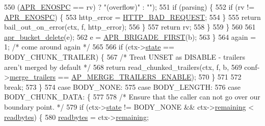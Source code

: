 \begin{DoxyCode}
{{{{{550                                       (\hyperlink{group__APR__Error_ga1dfc0bbf080f17b0b9010ef967542193}{APR\_ENOSPC} == rv) ? \textcolor{stringliteral}{"(overflow)"} : \textcolor{stringliteral}{""});
551                         \textcolor{keywordflow}{if} (parsing) \{
552                             \textcolor{keywordflow}{if} (rv != \hyperlink{group__APR__Error_ga1dfc0bbf080f17b0b9010ef967542193}{APR\_ENOSPC}) \{
553                                 http\_error = \hyperlink{group__HTTP__Status_ga0c1fdbbb10800664989907cbd3a5a023}{HTTP\_BAD\_REQUEST};
554                             \}
555                             \textcolor{keywordflow}{return} bail\_out\_on\_error(ctx, f, http\_error);
556                         \}
557                         \textcolor{keywordflow}{return} rv;
558                     \}
559                 \}
560 
561                 \hyperlink{group__APR__Util__Bucket__Brigades_ga8925c02a7f95e8c1c3986294d4678797}{apr\_bucket\_delete}(e);
562                 e = \hyperlink{group__APR__Util__Bucket__Brigades_gab5826a11eb6ba90786a94282f806c230}{APR\_BRIGADE\_FIRST}(b);
563             \}
564             again = 1; \textcolor{comment}{/* come around again */}
565 
566             \textcolor{keywordflow}{if} (ctx->\hyperlink{structhttp__filter__ctx_a2e84a1c737dd4daa565b328c875402cb}{state} == BODY\_CHUNK\_TRAILER) \{
567                 \textcolor{comment}{/* Treat UNSET as DISABLE - trailers aren't merged by default */}
568                 \textcolor{keywordflow}{return} read\_chunked\_trailers(ctx, f, b,
569                             conf->\hyperlink{structcore__server__config_a2608fe3794c66bb783bff4af1191446a}{merge\_trailers} == 
      \hyperlink{http__core_8h_ac1483475c601d9d111a63ddfee3fddc8}{AP\_MERGE\_TRAILERS\_ENABLE});
570             \}
571 
572             \textcolor{keywordflow}{break};
573         \}
574         \textcolor{keywordflow}{case} BODY\_NONE:
575         \textcolor{keywordflow}{case} BODY\_LENGTH:
576         \textcolor{keywordflow}{case} BODY\_CHUNK\_DATA: \{
577 
578             \textcolor{comment}{/* Ensure that the caller can not go over our boundary point. */}
579             \textcolor{keywordflow}{if} (ctx->\hyperlink{structhttp__filter__ctx_a2e84a1c737dd4daa565b328c875402cb}{state} != BODY\_NONE && ctx->\hyperlink{structhttp__filter__ctx_a669e4805b3738b515c0bc6d56f0f7ea7}{remaining} < 
      \hyperlink{group__APACHE__CORE__FILTER_ga0ce3dc88443223a04b0d1a3167356aee}{readbytes}) \{
580                 \hyperlink{group__APACHE__CORE__FILTER_ga0ce3dc88443223a04b0d1a3167356aee}{readbytes} = ctx->\hyperlink{structhttp__filter__ctx_a669e4805b3738b515c0bc6d56f0f7ea7}{remaining};
}}}}}
\end{DoxyCode}
